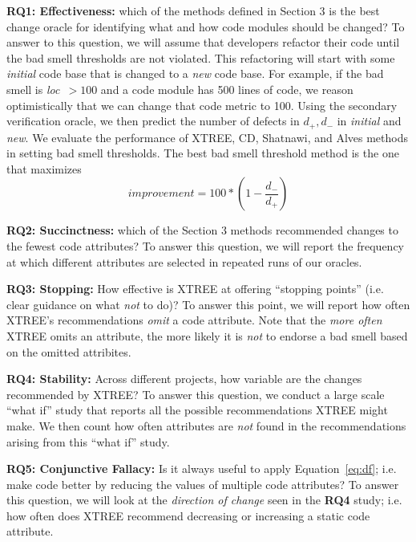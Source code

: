 \documentclass[twocolumn,5p]{elsarticle}
\newcommand{\eq}[1]{Equation~\ref{eq:#1}}
\theoremstyle{break}
\begin{document}
\begin{itemize}
		{\bf RQ1: Effectiveness: } which of the methods defined in Section 3 is the best change oracle for identifying what and how code modules should be changed? 
		To   answer to this question, we will assume that developers
		refactor their code until the bad smell thresholds are not violated.
		This refactoring will start with some {\em initial} code
		base that is changed to a {\em new} code base. 
		For example, if the bad smell is \mbox{{\em loc $>100$}} and a 
		code module has 500 lines of code, we reason
		optimistically that we can change that code metric
		to 100.  
		Using the secondary verification oracle,  we then predict the
		number of defects in $d_+,d_-$ in {\em initial} and {\em new}. We evaluate the performance of XTREE, CD, Shatnawi, and Alves methods in setting bad smell thresholds.
		The best bad smell threshold method is the one that maximizes
		\begin{equation}\label{eq:diff}
			\mathit{improvement} = 100* \left(1 - \frac{ d_- }{ d_+}\right)
		\end{equation}
		
		
		{\bf RQ2: Succinctness: } which of the Section 3 methods recommended changes to the fewest code attributes?
		To answer this question, we will report the frequency at which different attributes are selected in repeated runs of our oracles.
		
		{\bf RQ3: Stopping: }    How effective is XTREE at offering   ``stopping points'' (i.e. clear guidance on what {\em not} to do)?   
		To answer this point, we will report how often XTREE's recommendations {\em omit} a code attribute. 
		Note that the {\em more often} XTREE omits an attribute, the more likely it is {\em not} to endorse a bad smell based on the omitted
		attribites.
		
		{\bf RQ4: Stability:} Across different projects, how variable are the changes recommended by XTREE?   To answer this
		question, we conduct a large scale ``what if'' study that reports all the possible recommendations XTREE might make.
		We then count how often attributes are {\em not} found in the recommendations arising from this ``what if'' study.
		
		{\bf RQ5: Conjunctive Fallacy:} Is  it  always  useful  to  apply \eq{df}; i.e.   make  code  better  by  reducing  the  values  of multiple code attributes? To answer this question, we will look at the {\em direction of change} seen in the {\bf RQ4} study; i.e.
		how often does XTREE recommend decreasing or increasing a static code attribute.
		

\end{itemize}
\end{document}
